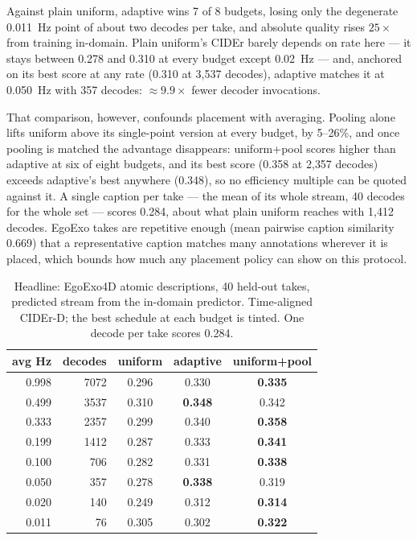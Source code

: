 \documentclass[journal]{IEEEtran}
\newcommand{\best}[1]{\cellcolor{hl}\textbf{#1}}
\begin{document}
Against plain uniform, adaptive wins 7 of 8 budgets, losing only the degenerate
0.011~Hz point of about two decodes per take, and absolute quality rises $25\times$
from training in-domain. Plain uniform's CIDEr barely depends on rate here --- it
stays between 0.278 and 0.310 at every budget except 0.02~Hz --- and, anchored on
its best score at any rate (0.310 at 3{,}537 decodes), adaptive matches it at
0.050~Hz with 357 decodes: $\approx 9.9\times$ fewer decoder invocations.

That comparison, however, confounds placement with averaging. Pooling alone lifts
uniform above its single-point version at every budget, by 5--26\%, and once
pooling is matched the advantage disappears: uniform+pool scores higher than
adaptive at six of eight budgets, and its best score (0.358 at 2{,}357 decodes)
exceeds adaptive's best anywhere (0.348), so no efficiency multiple can be quoted
against it. A single caption per take --- the mean of its whole stream, 40 decodes
for the whole set --- scores 0.284, about what plain uniform reaches with 1{,}412
decodes. EgoExo takes are repetitive enough (mean pairwise caption similarity
0.669) that a representative caption matches many annotations wherever it is
placed, which bounds how much any placement policy can show on this protocol.

\begin{table}[t]
\caption{Headline: EgoExo4D atomic descriptions, 40 held-out takes, predicted
stream from the in-domain predictor. Time-aligned CIDEr-D; the best schedule at
each budget is tinted. One decode per take scores 0.284.}
\label{tab:headline}
\centering
\footnotesize
\setlength{\tabcolsep}{5pt}
\begin{tabular}{rrccc}
\toprule
avg Hz & decodes & uniform & adaptive & uniform+pool \\
\midrule
0.998 & 7072 & 0.296 & 0.330 & \best{0.335} \\
0.499 & 3537 & 0.310 & \best{0.348} & 0.342 \\
0.333 & 2357 & 0.299 & 0.340 & \best{0.358} \\
0.199 & 1412 & 0.287 & 0.333 & \best{0.341} \\
0.100 & 706 & 0.282 & 0.331 & \best{0.338} \\
0.050 & 357 & 0.278 & \best{0.338} & 0.319 \\
0.020 & 140 & 0.249 & 0.312 & \best{0.314} \\
0.011 & 76 & 0.305 & 0.302 & \best{0.322} \\
\bottomrule
\end{tabular}
\end{table}
\end{document}
